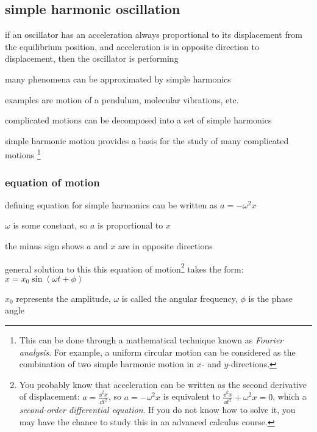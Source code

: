 \subsection{simple harmonic oscillation}

\begin{ilight}
	if an oscillator has an acceleration always proportional to its displacement from the equilibrium position, and acceleration is in opposite direction to displacement, then the oscillator is performing 
\end{ilight}

many phenomena can be approximated by simple harmonics

examples are motion of a pendulum, molecular vibrations, etc.

complicated motions can be decomposed into a set of simple harmonics

simple harmonic motion provides a basis for the study of many complicated motions
\footnote{This can be done through a mathematical technique known as \emph{Fourier analysis}. For example, a uniform circular motion can be considered as the combination of two simple harmonic motion in $x$- and $y$-directions.}

\subsubsection{equation of motion}

defining equation for simple harmonics can be written as $\boxed{a=-\omega^2 x}$

$\omega$ is some constant, so $a$ is proportional to $x$

the minus sign shows $a$ and $x$ are in opposite directions

\vspace*{\baselineskip} 

general solution to this this equation of motion\footnote{You probably know that acceleration can be written as the second derivative of displacement: $a=\frac{\dd^2 x}{\dd t^2}$, so $a=-\omega^2 x$ is equivalent to $\frac{\dd^2 x}{\dd t^2} + \omega^2 x = 0$, which a \emph{second-order differential equation}. If you do not know how to solve it, you may have the chance to study this in an advanced calculus course.} takes the form: $\boxed{x=x_0\sin(\omega t+\phi)}$

$x_0$ represents the amplitude, $\omega$ is called the angular frequency, $\phi$ is the phase angle

